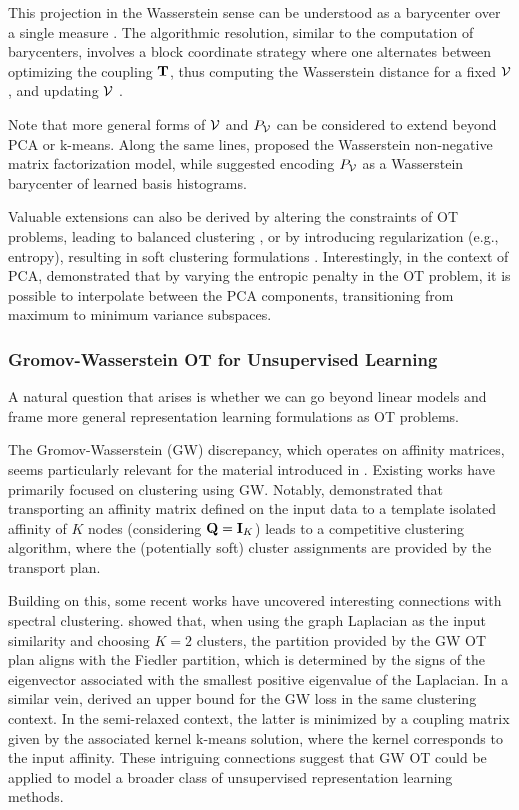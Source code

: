 This projection in the Wasserstein sense can be understood as a barycenter over a single measure \citep{agueh2011barycenters}. The algorithmic resolution, similar to the computation of barycenters, involves a block coordinate strategy where one alternates between optimizing the coupling ${\mathbf{T}}$, thus computing the Wasserstein distance for a fixed ${\mathcal{V}}$, and updating ${\mathcal{V}}$ \citep{cuturi2014fast}. 

Note that more general forms of ${\mathcal{V}}$ and $P_{{\mathcal{V}}}$ can be considered to extend beyond PCA or k-means. Along the same lines, \citep{sandler2011nonnegative} proposed the Wasserstein non-negative matrix factorization model, while \citep{schmitz2018wasserstein} suggested encoding $P_{{\mathcal{V}}}$ as a Wasserstein barycenter of learned basis histograms.

Valuable extensions can also be derived by altering the constraints of OT problems, leading to balanced clustering \citep{de2023balanced}, or by introducing regularization (e.g., entropy), resulting in soft clustering formulations \citep{ferraro2020soft}. Interestingly, in the context of PCA, \cite{collas2023entropic} demonstrated that by varying the entropic penalty in the OT problem, it is possible to interpolate between the PCA components, transitioning from maximum to minimum variance subspaces.


\subsubsection{Gromov-Wasserstein OT for Unsupervised Learning}

A natural question that arises is whether we can go beyond linear models and frame more general representation learning formulations as OT problems.

The Gromov-Wasserstein (GW) discrepancy, which operates on affinity matrices, seems particularly relevant for the material introduced in . Existing works have primarily focused on clustering using GW. Notably, \citep{xu2019scalable} demonstrated that transporting an affinity matrix defined on the input data to a template isolated affinity of $K$ nodes (\ie considering ${\mathbf{Q}} = {\mathbf{I}}_K$) leads to a competitive clustering algorithm, where the (potentially soft) cluster assignments are provided by the transport plan. 

Building on this, some recent works have uncovered interesting connections with spectral clustering. \citep{chowdhury2021generalized} showed that, when using the graph Laplacian as the input similarity and choosing $K=2$ clusters, the partition provided by the GW OT plan aligns with the Fiedler partition, which is determined by the signs of the eigenvector associated with the smallest positive eigenvalue of the Laplacian. In a similar vein, \citep{chen2023gromov} derived an upper bound for the GW loss in the same clustering context. In the semi-relaxed context, the latter is minimized by a coupling matrix given by the associated kernel k-means solution, where the kernel corresponds to the input affinity. These intriguing connections suggest that GW OT could be applied to model a broader class of unsupervised representation learning methods.


